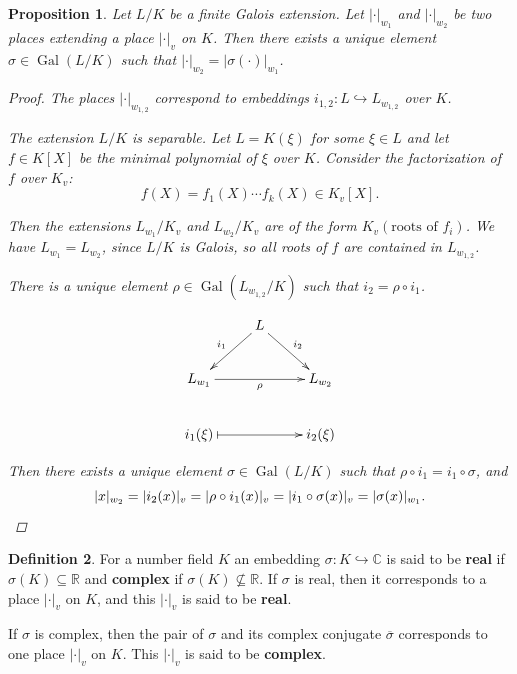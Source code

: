 \documentclass{article}
\newtheorem{proposition}{Proposition}[section]
\theoremstyle{definition}
\newtheorem{definition}[proposition]{Definition}
\DeclareMathOperator{\Gal}{Gal}
\newcommand{\term}{\textbf}
\newcommand{\CC}{\mathbb{C}}
\newcommand{\RR}{\mathbb{R}}
\begin{document}
\begin{proposition}
  \label{proposition:Galois-action-on-places}
  Let $L/K$ be a finite Galois extension. Let $|\cdot|_{w_1}$ and
  $|\cdot|_{w_2}$ be two places extending a place $|\cdot|_v$ on $K$. Then there
  exists a unique element $\sigma \in \Gal (L/K)$ such that
  $|\cdot|_{w_2} = |\sigma (\cdot)|_{w_1}$.

  \begin{proof}
    The places $|\cdot|_{w_{1,2}}$ correspond to embeddings
    $i_{1,2}\colon L \hookrightarrow L_{w_{1,2}}$ over $K$.

    The extension $L/K$ is separable. Let $L = K (\xi)$ for some $\xi \in L$ and
    let $f \in K[X]$ be the minimal polynomial of $\xi$ over $K$. Consider the
    factorization of $f$ over $K_v$:
    $$f (X) = f_1 (X) \cdots f_k (X) \in K_v [X].$$

    Then the extensions $L_{w_1}/K_v$ and $L_{w_2}/K_v$ are of the form
    $K_v (\text{roots of } f_i)$. We have $L_{w_1} = L_{w_2}$, since $L/K$ is
    Galois, so all roots of $f$ are contained in $L_{w_{1,2}}$.

    There is a unique element $\rho\in \Gal (L_{w_{1,2}}/K)$ such that
    $i_2 = \rho\circ i_1$.

    \[ \xymatrix{ & L\ar[dl]_{i_1}\ar[dr]^{i_2}\\
        L_{w_1}\ar[rr]_{\rho} & & L_{w_2}\\
        i_1 (\xi)\ar@{|->}[rr] & & i_2 (\xi)} \]

    Then there exists a unique element $\sigma \in \Gal (L/K)$ such that
    $\rho\circ i_1 = i_1\circ \sigma$, and
    \[ |x|_{w_2} = |i_2 (x)|_v = |\rho\circ i_1 (x)|_v =
      |i_1\circ \sigma (x)|_v = |\sigma (x)|_{w_1}. \qedhere \]
  \end{proof}
\end{proposition}

\begin{definition}
  For a number field $K$ an embedding $\sigma\colon K \hookrightarrow \CC$ is
  said to be \term{real} if $\sigma (K) \subseteq \RR$ and \term{complex} if
  $\sigma (K) \not\subseteq \RR$. If $\sigma$ is real, then it corresponds to a
  place $|\cdot|_v$ on $K$, and this $|\cdot|_v$ is said to be \term{real}.

  If $\sigma$ is complex, then the pair of $\sigma$ and its complex conjugate
  $\overline{\sigma}$ corresponds to one place $|\cdot|_v$ on $K$. This
  $|\cdot|_v$ is said to be \term{complex}.
\end{definition}
\end{document}
